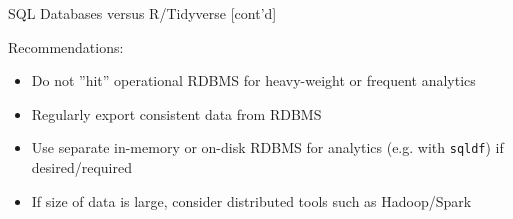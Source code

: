 \documentclass[ignorenonframetext,xcolor=x11names]{beamer}
\begin{document}
\begin{frame}[label=full]{SQL Databases versus R/Tidyverse \small [cont'd]}
\begin{block}{Recommendations:}
  \begin{itemize}
     \item Do not ''hit'' operational RDBMS for heavy-weight or frequent analytics
     \item Regularly export consistent data from RDBMS
     \item Use separate in-memory or on-disk RDBMS for analytics (e.g. with \texttt{sqldf}) if desired/required
     \item If size of data is large, consider distributed tools such as Hadoop/Spark
  \end{itemize}
\end{block}
\end{frame}
\end{document}
